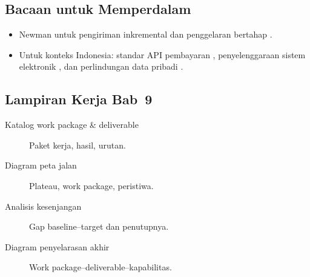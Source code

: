 \subsection*{Bacaan untuk Memperdalam}
\begin{itemize}
  \item Newman untuk pengiriman inkremental dan penggelaran bertahap
        \cite{newman2021building}.
  \item Untuk konteks Indonesia: standar API pembayaran \cite{snapbi},
        penyelenggaraan sistem elektronik \cite{pp712019}, dan perlindungan data
        pribadi \cite{uupdp2022}.
\end{itemize}

\subsection*{Lampiran Kerja Bab~9}
\begin{description}
  \item[Katalog work package \& deliverable] Paket kerja, hasil, urutan.
  \item[Diagram peta jalan] Plateau, work package, peristiwa.
  \item[Analisis kesenjangan] Gap baseline--target dan penutupnya.
  \item[Diagram penyelarasan akhir] Work package--deliverable--kapabilitas.
\end{description}
\setlength{\emergencystretch}{0pt}
